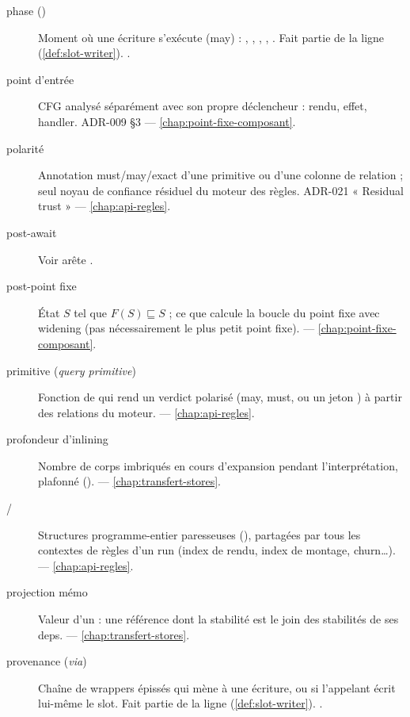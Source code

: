 \begin{description}
\item[phase ()] Moment où une écriture s'exécute (may) : , , , , . Fait partie de la ligne  (\cref{def:slot-writer}). .

\item[point d'entrée] CFG analysé séparément avec son propre déclencheur : rendu, effet, handler. ADR-009 §3 — \cref{chap:point-fixe-composant}.

\item[polarité] Annotation must/may/exact d'une primitive ou d'une colonne de relation ; seul noyau de confiance résiduel du moteur des règles. ADR-021 « Residual trust » — \cref{chap:api-regles}.

\item[post-await] Voir arête .

\item[post-point fixe] État \(S\) tel que \(F(S) \sqsubseteq S\) ; ce que calcule la boucle du point fixe avec widening (pas nécessairement le plus petit point fixe).  — \cref{chap:point-fixe-composant}.

\item[primitive (\emph{query primitive})] Fonction de  qui rend un verdict polarisé (may, must, ou un jeton ) à partir des relations du moteur.  — \cref{chap:api-regles}.

\item[profondeur d'inlining] Nombre de corps imbriqués en cours d'expansion pendant l'interprétation, plafonné ().  — \cref{chap:transfert-stores}.

\item[ / ] Structures programme-entier paresseuses (), partagées par tous les contextes de règles d'un run (index de rendu, index de montage, churn\ldots).  — \cref{chap:api-regles}.

\item[projection mémo] Valeur d'un  : une référence dont la stabilité est le join des stabilités de ses deps.  — \cref{chap:transfert-stores}.

\item[provenance (\emph{via})] Chaîne de wrappers épissés qui mène à une écriture, ou  si l'appelant écrit lui-même le slot. Fait partie de la ligne  (\cref{def:slot-writer}). .


\end{description}
